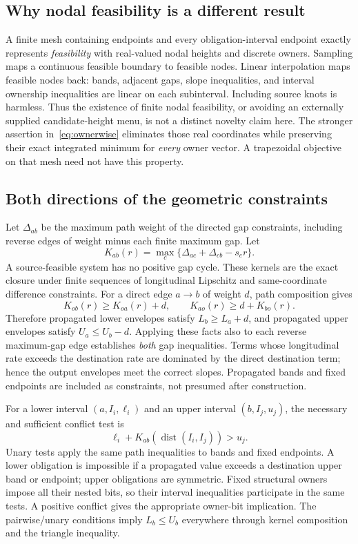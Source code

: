 \documentclass[10pt,letterpaper]{article}
\newcommand{\dist}{\operatorname{dist}}
\begin{document}
\subsection{Why nodal feasibility is a different result}
A finite mesh containing endpoints and every obligation-interval endpoint exactly represents \emph{feasibility} with real-valued nodal heights and discrete owners. Sampling maps a continuous feasible boundary to feasible nodes. Linear interpolation maps feasible nodes back: bands, adjacent gaps, slope inequalities, and interval ownership inequalities are linear on each subinterval. Including source knots is harmless. Thus the existence of finite nodal feasibility, or avoiding an externally supplied candidate-height menu, is not a distinct novelty claim here. The stronger assertion in~\eqref{eq:ownerwise} eliminates those real coordinates while preserving their exact integrated minimum for \emph{every} owner vector. A trapezoidal objective on that mesh need not have this property.

\subsection{Both directions of the geometric constraints}
Let $\Delta_{ab}$ be the maximum path weight of the directed gap constraints, including reverse edges of weight minus each finite maximum gap. Let
\[
 K_{ab}(r)=\max_c\{\Delta_{ac}+\Delta_{cb}-s_c r\}.
\]
A source-feasible system has no positive gap cycle. These kernels are the exact closure under finite sequences of longitudinal Lipschitz and same-coordinate difference constraints. For a direct edge $a\to b$ of weight $d$, path composition gives
\[
 K_{ob}(r)\ge K_{oa}(r)+d,\qquad
 K_{ao}(r)\ge d+K_{bo}(r).
\]
Therefore propagated lower envelopes satisfy $L_b\ge L_a+d$, and propagated upper envelopes satisfy $U_a\le U_b-d$. Applying these facts also to each reverse maximum-gap edge establishes \emph{both} gap inequalities. Terms whose longitudinal rate exceeds the destination rate are dominated by the direct destination term; hence the output envelopes meet the correct slopes. Propagated bands and fixed endpoints are included as constraints, not presumed after construction.

For a lower interval $(a,I_i,\ell_i)$ and an upper interval $(b,I_j,u_j)$, the necessary and sufficient conflict test is
\[
 \ell_i+K_{ab}(\dist(I_i,I_j))>u_j.
\]
Unary tests apply the same path inequalities to bands and fixed endpoints. A lower obligation is impossible if a propagated value exceeds a destination upper band or endpoint; upper obligations are symmetric. Fixed structural owners impose all their nested bits, so their interval inequalities participate in the same tests. A positive conflict gives the appropriate owner-bit implication. The pairwise/unary conditions imply $L_b\le U_b$ everywhere through kernel composition and the triangle inequality.
\end{document}
